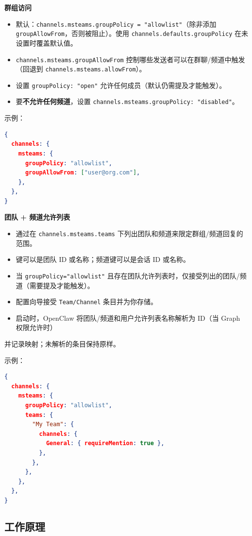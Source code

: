 \textbf{群组访问}

\begin{itemize}
  \item 默认：\texttt{channels.msteams.groupPolicy = "allowlist"}（除非添加 \texttt{groupAllowFrom}，否则被阻止）。使用 \texttt{channels.defaults.groupPolicy} 在未设置时覆盖默认值。
  \item \texttt{channels.msteams.groupAllowFrom} 控制哪些发送者可以在群聊/频道中触发（回退到 \texttt{channels.msteams.allowFrom}）。
  \item 设置 \texttt{groupPolicy: "open"} 允许任何成员（默认仍需提及才能触发）。
  \item 要\textbf{不允许任何频道}，设置 \texttt{channels.msteams.groupPolicy: "disabled"}。
\end{itemize}


示例：

\begin{lstlisting}[language=json]
{
  channels: {
    msteams: {
      groupPolicy: "allowlist",
      groupAllowFrom: ["user@org.com"],
    },
  },
}
\end{lstlisting}


\textbf{团队 + 频道允许列表}

\begin{itemize}
  \item 通过在 \texttt{channels.msteams.teams} 下列出团队和频道来限定群组/频道回复的范围。
  \item 键可以是团队 ID 或名称；频道键可以是会话 ID 或名称。
  \item 当 \texttt{groupPolicy="allowlist"} 且存在团队允许列表时，仅接受列出的团队/频道（需要提及才能触发）。
  \item 配置向导接受 \texttt{Team/Channel} 条目并为你存储。
  \item 启动时，OpenClaw 将团队/频道和用户允许列表名称解析为 ID（当 Graph 权限允许时）
\end{itemize}

并记录映射；未解析的条目保持原样。

示例：

\begin{lstlisting}[language=json]
{
  channels: {
    msteams: {
      groupPolicy: "allowlist",
      teams: {
        "My Team": {
          channels: {
            General: { requireMention: true },
          },
        },
      },
    },
  },
}
\end{lstlisting}


\subsection{工作原理}


